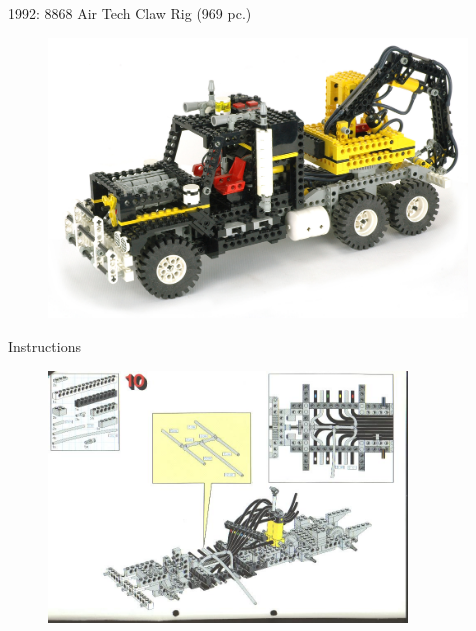 \documentclass[xcolor=dvipsnames]{beamer}
\begin{document}
\begin{frame}[fragile]{1992: 8868 Air Tech Claw Rig (969 pc.)}
\begin{figure}[H]
 \centering
 \includegraphics[width=0.99\textwidth]{1992_8868_truck.jpg}
\end{figure}
\end{frame}

\begin{frame}[fragile]{Instructions}
\begin{figure}[H]
 \centering
 \includegraphics[width=0.85\textwidth]{1992_8868_truck_instruction_10.jpg}
\end{figure}
\end{frame}
\end{document}
